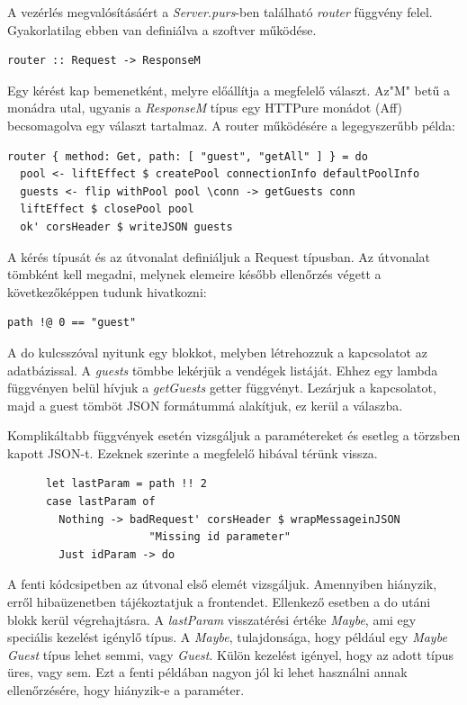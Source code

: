 \documentclass[12pt]{article}
\begin{document}
A vezérlés megvalósításáért a \textit{Server.purs}-ben található \textit{router} függvény felel. Gyakorlatilag ebben van definiálva a szoftver működése.
\begin{verbatim}
router :: Request -> ResponseM
\end{verbatim}
Egy kérést kap bemenetként, melyre előállítja a megfelelő választ. Az"M" betű a monádra utal, ugyanis a \textit{ResponseM} típus egy HTTPure monádot (Aff) becsomagolva egy választ tartalmaz. A router működésére a legegyszerűbb példa:
\begin{verbatim}
router { method: Get, path: [ "guest", "getAll" ] } = do
  pool <- liftEffect $ createPool connectionInfo defaultPoolInfo
  guests <- flip withPool pool \conn -> getGuests conn
  liftEffect $ closePool pool
  ok' corsHeader $ writeJSON guests
\end{verbatim}
A kérés típusát és az útvonalat definiáljuk a Request típusban. Az útvonalat tömbként kell megadni, melynek elemeire később ellenőrzés végett a következőképpen tudunk hivatkozni:
\begin{verbatim}
path !@ 0 == "guest"
\end{verbatim}
A do kulcsszóval nyitunk egy blokkot, melyben létrehozzuk a kapcsolatot az adatbázissal. A \textit{guests} tömbbe lekérjük a vendégek listáját. Ehhez egy lambda függvényen belül hívjuk a \textit{getGuests} getter függvényt. Lezárjuk a kapcsolatot, majd a guest tömböt JSON formátummá alakítjuk, ez kerül a válaszba.

Komplikáltabb függvények esetén vizsgáljuk a paramétereket és esetleg a törzsben kapott JSON-t. Ezeknek szerinte a megfelelő hibával térünk vissza.
\begin{verbatim}
      let lastParam = path !! 2
      case lastParam of
        Nothing -> badRequest' corsHeader $ wrapMessageinJSON 
                      "Missing id parameter"
        Just idParam -> do
\end{verbatim}
A fenti kódcsipetben az útvonal első elemét vizsgáljuk. Amennyiben hiányzik, erről hibaüzenetben tájékoztatjuk a frontendet. Ellenkező esetben a do utáni blokk kerül végrehajtásra. A \textit{lastParam} visszatérési értéke \textit{Maybe}, ami egy speciális kezelést igénylő típus. A \textit{Maybe}, tulajdonsága, hogy például egy \textit{Maybe Guest} típus lehet semmi, vagy \textit{Guest}. Külön kezelést igényel, hogy az adott típus üres, vagy sem. Ezt a fenti példában nagyon jól ki lehet használni annak ellenőrzésére, hogy hiányzik-e a paraméter.

\newpage
\end{document}
